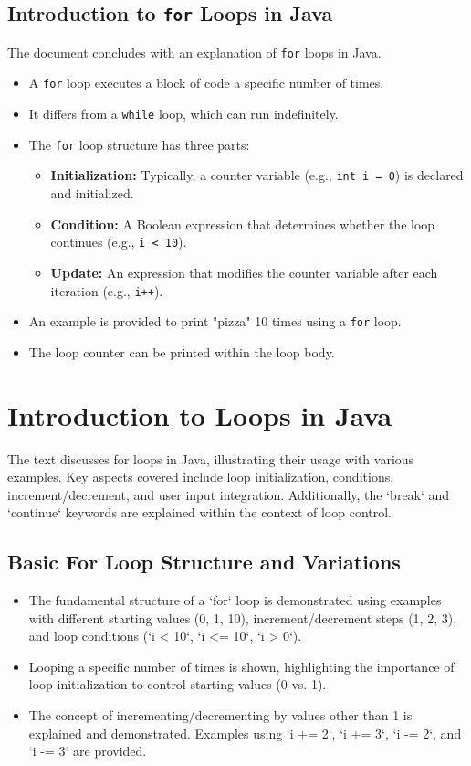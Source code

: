 \documentclass{article}
\begin{document}
\subsection{Introduction to \texttt{for} Loops in Java}

The document concludes with an explanation of \texttt{for} loops in Java.

\begin{itemize}
    \item A \texttt{for} loop executes a block of code a specific number of times.
    \item It differs from a \texttt{while} loop, which can run indefinitely.
    \item The \texttt{for} loop structure has three parts:
    \begin{itemize}
        \item \textbf{Initialization:} Typically, a counter variable (e.g., \texttt{int i = 0}) is declared and initialized.
        \item \textbf{Condition:} A Boolean expression that determines whether the loop continues (e.g., \texttt{i < 10}).
        \item \textbf{Update:} An expression that modifies the counter variable after each iteration (e.g., \texttt{i++}).
    \end{itemize}
    \item An example is provided to print "pizza" 10 times using a \texttt{for} loop.
    \item The loop counter can be printed within the loop body.
\end{itemize}


\section{Introduction to Loops in Java}

The text discusses for loops in Java, illustrating their usage with various examples.  Key aspects covered include loop initialization, conditions, increment/decrement, and user input integration.  Additionally, the `break` and `continue` keywords are explained within the context of loop control.

\subsection{Basic For Loop Structure and Variations}

\begin{itemize}
    \item The fundamental structure of a `for` loop is demonstrated using examples with different starting values (0, 1, 10), increment/decrement steps (1, 2, 3), and loop conditions (`i < 10`, `i <= 10`, `i > 0`).
    \item Looping a specific number of times is shown, highlighting the importance of loop initialization to control starting values (0 vs. 1).
    \item  The concept of incrementing/decrementing by values other than 1 is explained and demonstrated.  Examples using `i += 2`, `i += 3`, `i -= 2`, and `i -= 3` are provided.
\end{itemize}
\end{document}
